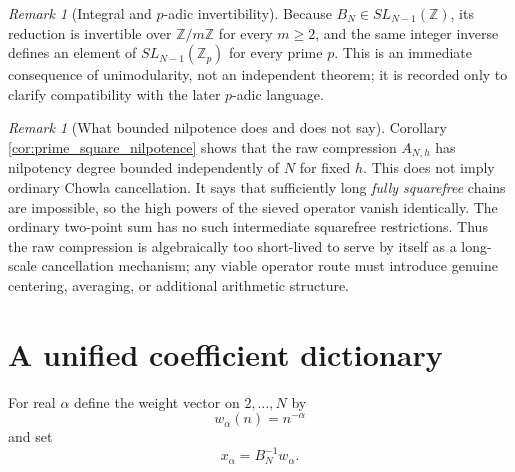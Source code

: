\documentclass[11pt]{amsart}
\numberwithin{equation}{section}
\theoremstyle{plain}
\theoremstyle{definition}
\theoremstyle{remark}
\newtheorem{remark}[theorem]{Remark}
\newcommand{\Z}{\mathbb Z}
\begin{document}
\begin{remark}[Integral and $p$-adic invertibility]
\label{rem:modular_padic_invertibility}
Because $B_N\in SL_{N-1}(\Z)$, its reduction is invertible over $\Z/m\Z$ for every $m\ge2$, and the same integer inverse defines an element of $SL_{N-1}(\Z_p)$ for every prime $p$.  This is an immediate consequence of unimodularity, not an independent theorem; it is recorded only to clarify compatibility with the later $p$-adic language.
\end{remark}

\begin{remark}[What bounded nilpotence does and does not say]
\label{rem:bounded_nilpotence_closes_raw_route}
Corollary \ref{cor:prime_square_nilpotence} shows that the raw compression $A_{N,h}$ has nilpotency degree bounded independently of $N$ for fixed $h$.  This does not imply ordinary Chowla cancellation.  It says that sufficiently long \emph{fully squarefree} chains are impossible, so the high powers of the sieved operator vanish identically.  The ordinary two-point sum has no such intermediate squarefree restrictions.  Thus the raw compression is algebraically too short-lived to serve by itself as a long-scale cancellation mechanism; any viable operator route must introduce genuine centering, averaging, or additional arithmetic structure.
\end{remark}

\section{A unified coefficient dictionary}
\label{sec:dictionary}

For real $\alpha$ define the weight vector on $2,\ldots,N$ by
\begin{equation}
w_\alpha(n)=n^{-\alpha}
\label{eq:w_alpha}
\end{equation}
and set
\begin{equation}
x_\alpha=B_N^{-1}w_\alpha.
\label{eq:x_alpha_definition}
\end{equation}
\end{document}
